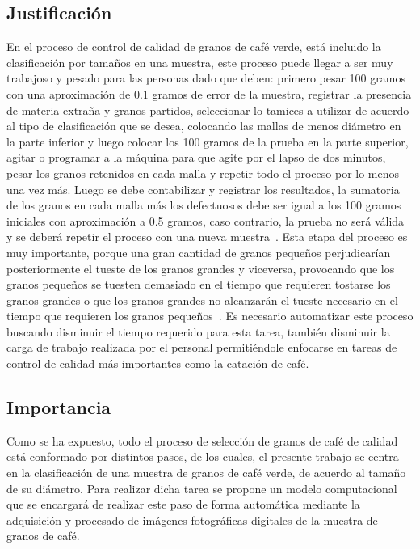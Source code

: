 \subsection{Justificación}
En el proceso de control de calidad de granos de café verde, está incluido la clasificación por tamaños en una muestra, este proceso puede llegar a ser muy trabajoso y pesado para las personas dado que deben: primero pesar 100 gramos con una aproximación de 0.1 gramos de error de la muestra, registrar la presencia de materia extraña y granos partidos, seleccionar lo tamices a utilizar de acuerdo al tipo de clasificación que se desea, colocando las mallas de menos diámetro en la parte inferior y luego colocar los 100 gramos de la prueba en la parte superior, agitar o programar a la máquina para que agite por el lapso de dos minutos, pesar los granos retenidos en cada malla y repetir todo el proceso por lo menos una vez más. Luego se debe contabilizar y registrar los resultados, la sumatoria de los granos en cada malla más los defectuosos debe ser igual a los 100 gramos iniciales con aproximación a 0.5 gramos, caso contrario, la prueba no será válida y se deberá repetir el proceso con una nueva muestra~\citep{Funez2010}. Esta etapa del proceso es muy importante, porque una gran cantidad de granos pequeños perjudicarían posteriormente el tueste de los granos grandes y viceversa, provocando que los granos pequeños se tuesten demasiado en el tiempo que requieren tostarse los granos grandes o que los granos grandes no alcanzarán el tueste necesario en el tiempo que requieren los granos pequeños~\citep{Hilten2011}. Es necesario automatizar este proceso buscando disminuir el tiempo requerido para esta tarea, también disminuir la carga de trabajo realizada por el personal permitiéndole enfocarse en tareas de control de calidad más importantes como la catación de café.

\subsection{Importancia}
Como se ha expuesto, todo el proceso de selección de granos de café de calidad está conformado por distintos pasos, de los cuales, el presente trabajo se centra en la clasificación de una muestra de granos de café verde, de acuerdo al tamaño de su diámetro. Para realizar dicha tarea se propone un modelo computacional que se encargará de realizar este paso de forma automática mediante la adquisición y procesado de imágenes fotográficas digitales de la muestra de granos de café.

